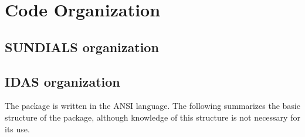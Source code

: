 \chapter{Code Organization}\label{s:organization}

\section{SUNDIALS organization}\label{ss:sun_org}


\section{IDAS organization}\label{ss:idas_org}

The {\idas} package is written in the ANSI {\CC} language. The following
summarizes the basic structure of the package, although knowledge
of this structure is not necessary for its use.

